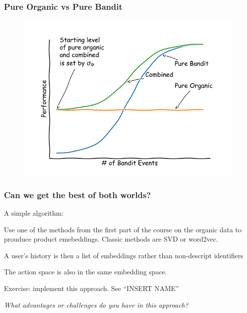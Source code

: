 

\begin{frame}
  \frametitle{Pure Organic vs Pure Bandit}
\begin{figure}[h!]
\includegraphics[scale=0.45]{images/pureorganicpurebandit.png}
\centering
\end{figure}
\end{frame}






\begin{frame}
  \frametitle{Can we get the best of both worlds?}

A simple algorithm:

\pause
Use one of the methods from the first part of the course on the organic data to prouduce product emebeddings.  Classic methods are SVD or word2vec.

\pause

A user's history is then a list of embeddings rather than non-descript identifiers

\pause

The action space is also in the same embedding space.

\pause

Exercise: implement this approach.  See ``INSERT NAME''

\pause

\emph{What advantages or challenges do you have in this approach?}
\end{frame}








